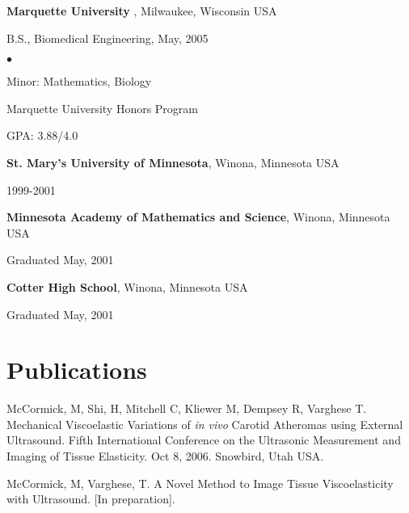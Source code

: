 \documentclass[margin,line]{res}
\newenvironment{list1}{
  \begin{list}{\ding{113}}{%
      \setlength{\itemsep}{0in}
      \setlength{\parsep}{0in} \setlength{\parskip}{0in}
      \setlength{\topsep}{0in} \setlength{\partopsep}{0in} 
      \setlength{\leftmargin}{0.17in}}}{\end{list}}
\newenvironment{list2}{
  \begin{list}{$\bullet$}{%
      \setlength{\itemsep}{0in}
      \setlength{\parsep}{0in} \setlength{\parskip}{0in}
      \setlength{\topsep}{0in} \setlength{\partopsep}{0in} 
      \setlength{\leftmargin}{0.2in}}}{\end{list}}
\begin{document}
\begin{resume}
{\bf Marquette University }, Milwaukee, Wisconsin USA\\
\vspace*{-.1in}
\begin{list1}
\item[] B.S., Biomedical Engineering,  May, 2005

\begin{list2}
 \vspace*{.05in}
 \item Minor: Mathematics, Biology
 \item Marquette University Honors Program
 \item GPA: 3.88/4.0
\end{list2}
\end{list1}

{\bf St. Mary's University of Minnesota}, Winona, Minnesota USA\\
\vspace*{-.1in}
\begin{list1}
\item[] 1999-2001
\end{list1}


{\bf Minnesota Academy of Mathematics and Science}, Winona, Minnesota USA\\
\vspace*{-.1in}
\begin{list1}
\item[] Graduated May, 2001
\end{list1}

{\bf Cotter High School}, Winona, Minnesota USA\\
\vspace*{-.1in}
\begin{list1}
\item[] Graduated May, 2001
\end{list1}



\section{\sc Publications}
McCormick, M, Shi, H, Mitchell C, Kliewer M, Dempsey R, Varghese T.   Mechanical Viscoelastic Variations of \textit{in vivo} Carotid Atheromas using External Ultrasound.  Fifth International Conference on the Ultrasonic Measurement and Imaging of Tissue Elasticity.  Oct 8, 2006.  Snowbird, Utah USA.

McCormick, M, Varghese, T.  A Novel Method to Image Tissue Viscoelasticity with Ultrasound. [In preparation].


\end{resume}
\end{document}
